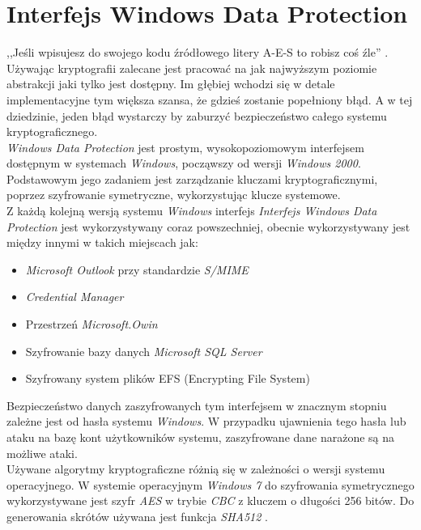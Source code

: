 \section{Interfejs Windows Data Protection} \label{wdp}
,,Jeśli wpisujesz do swojego kodu źródłowego litery A-E-S to robisz coś źle'' \cite{lettersaes}. 
Używając kryptografii zalecane jest pracować na jak najwyższym poziomie abstrakcji jaki tylko 
jest dostępny. Im głębiej wchodzi się w detale implementacyjne tym większa szansa, że 
gdzieś zostanie popełniony błąd. A w tej dziedzinie, jeden błąd wystarczy by zaburzyć 
bezpieczeństwo całego systemu kryptograficznego. \\
\textit{Windows Data Protection} jest prostym, wysokopoziomowym interfejsem dostępnym w systemach 
\textit{Windows}, począwszy od wersji \textit{Windows 2000}. 
Podstawowym jego zadaniem jest zarządzanie kluczami kryptograficznymi, poprzez szyfrowanie symetryczne,
wykorzystując klucze systemowe. \\ 
Z każdą kolejną wersją systemu \textit{Windows} interfejs \textit{Interfejs Windows Data Protection} 
jest wykorzystywany coraz powszechniej, obecnie wykorzystywany jest między innymi w takich miejscach jak:
\begin{itemize}
	\item \textit{Microsoft Outlook} przy standardzie \textit{S/MIME}
	\item \textit{Credential Manager}
	\item Przestrzeń \textit{Microsoft.Owin} 
	\item Szyfrowanie bazy danych \textit{Microsoft SQL Server} 
	\item Szyfrowany system plików EFS (Encrypting File System)
\end{itemize}
Bezpieczeństwo danych zaszyfrowanych tym interfejsem w znacznym stopniu zależne jest od hasła 
systemu \textit{Windows}. W przypadku ujawnienia tego hasła lub ataku na bazę kont użytkowników systemu,
zaszyfrowane dane narażone są na możliwe ataki. \\
Używane algorytmy kryptograficzne różnią się w zależności o wersji systemu operacyjnego. 
W systemie operacyjnym \textit{Windows 7} do szyfrowania symetrycznego wykorzystywane jest szyfr \textit{AES} 
w trybie \textit{CBC} z kluczem o długości 256 bitów. 
Do generowania skrótów używana jest funkcja \textit{SHA512} \cite{dpapi}.
